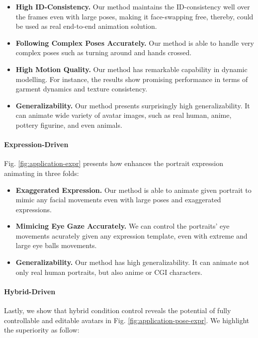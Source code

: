 \begin{itemize}
    \item \textbf{High ID-Consistency.} Our method maintains the ID-consistency well over the frames even with large poses, making it face-swapping free, thereby, could be used as real end-to-end animation solution.
    \item \textbf{Following Complex Poses Accurately.} Our method is able to handle very complex poses such as turning around and hands crossed.
    \item \textbf{High Motion Quality.} Our method has remarkable capability in dynamic modelling. For instance, the results show promising performance in terms of garment dynamics and texture consistency.
    \item \textbf{Generalizability.} Our method presents surprisingly high generalizability. It can animate wide variety of avatar images, such as real human, anime, pottery figurine, and even animals. 
\end{itemize}

\paragraph{Expression-Driven}Fig. \ref{fig:application-expr} presents how {\nameofmethod} enhances the portrait expression animating in three folds:

\begin{itemize}
    \item \textbf{Exaggerated Expression.} Our method is able to animate given portrait to mimic any facial movements even with large poses and exaggerated expressions.
    \item \textbf{Mimicing Eye Gaze Accurately.} We can control the portraits' eye movements acurately given any expression template, even with extreme and large eye balls movements.
    \item \textbf{Generalizability.} Our method has high generalizability. It can animate not only real human portraits, but also anime or CGI characters.
\end{itemize}

\paragraph{Hybrid-Driven} Lastly, we show that hybrid condition control reveals the potential of fully controllable and editable avatars in Fig. \ref{fig:application-pose-expr}. We highlight the superiority as follow:

